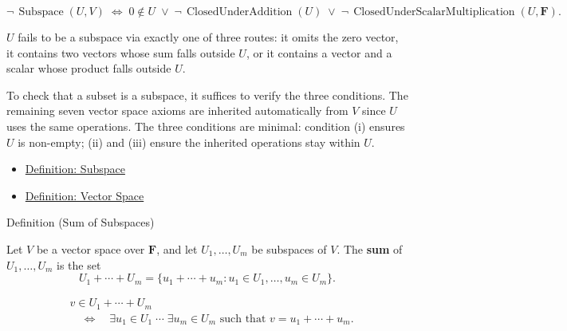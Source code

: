 \begin{remark*}
\[
\neg\,\operatorname{Subspace}(U,V)
\;\Longleftrightarrow\;
0 \notin U
\;\vee\;
\neg\,\operatorname{ClosedUnderAddition}(U)
\;\vee\;
\neg\,\operatorname{ClosedUnderScalarMultiplication}(U,\mathbf{F}).
\]
\end{remark*}

\begin{remark*}
$U$ fails to be a subspace via exactly one of three routes: it omits the zero
vector, it contains two vectors whose sum falls outside $U$, or it contains a
vector and a scalar whose product falls outside $U$.
\end{remark*}

\begin{remark*}[Interpretation]
To check that a subset is a subspace, it suffices to verify the three
conditions. The remaining seven vector space axioms are inherited automatically
from $V$ since $U$ uses the same operations. The three conditions are minimal:
condition (i) ensures $U$ is non-empty; (ii) and (iii) ensure the inherited
operations stay within $U$.
\end{remark*}

\begin{remark*}[Dependencies]
\begin{itemize}
  \item \hyperref[def:subspace]{Definition: Subspace}
  \item \hyperref[def:vector-space]{Definition: Vector Space}
\end{itemize}
\end{remark*}


\begin{definitionbox}{Definition (Sum of Subspaces)}
\begin{definition}
\label{def:sum-of-subspaces}
Let $V$ be a vector space over $\mathbf{F}$, and let
$U_1,\dots,U_m$ be subspaces of $V$.
The \textbf{sum} of $U_1,\dots,U_m$ is the set
\[
U_1+\cdots+U_m
=
\{u_1+\cdots+u_m : u_1 \in U_1,\dots,u_m \in U_m\}.
\]
\end{definition}
\end{definitionbox}

\begin{remark*}
\[
\begin{aligned}
&v \in U_1+\cdots+U_m \\
&\quad\Longleftrightarrow\quad
\exists u_1 \in U_1 \;\cdots\; \exists u_m \in U_m
\text{ such that } v=u_1+\cdots+u_m.
\end{aligned}
\]
\end{remark*}

